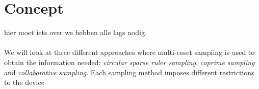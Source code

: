 \documentclass[a4paper, openany, oneside]{memoir}
\begin{document}
\section{Concept}
hier moet iets over we hebben alle lags nodig.\\
\\
We will look at three different approaches where multi-coset sampling is used to obtain the information needed: \textit{circular sparse ruler sampling}, \textit{coprime sampling} and \textit{collaborative sampling}. Each sampling method imposes different restrictions to the device
\end{document}
